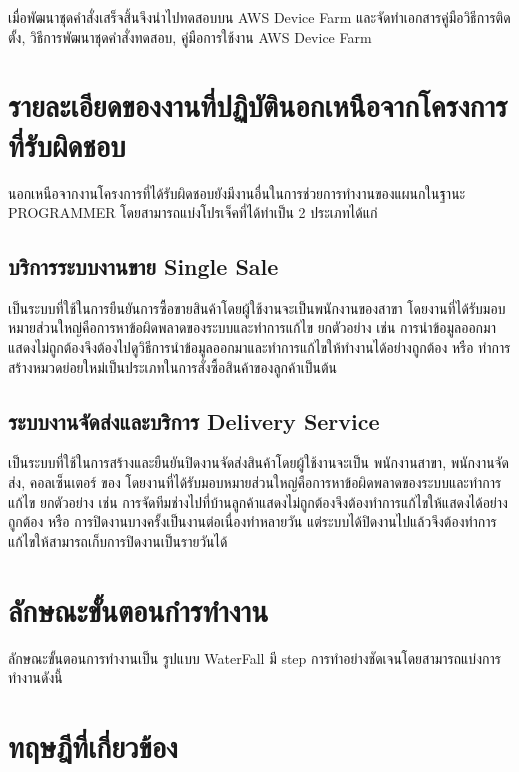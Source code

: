         เมื่อพัฒนาชุดคำสั่งเสร็จสิ้นจึงนำไปทดสอบบน AWS Device Farm และจัดทำเอกสารคู่มือวิธีการติดตั้ง, วิธีการพัฒนาชุดคำสั่งทดสอบ, คู่มือการใช้งาน AWS Device Farm

\newpage
\section{รายละเอียดของงานที่ปฏิบัตินอกเหนือจากโครงการที่รับผิดชอบ}
    นอกเหนือจากงานโครงการที่ได้รับผิดชอบยังมีงานอื่นในการช่วยการทำงานของแผนกในฐานะ PROGRAMMER โดยสามารถแบ่งโปรเจ็คที่ได้ทำเป็น 2 ประเภทได้แก่
    
    \subsection{บริการระบบงานขาย Single Sale}
        เป็นระบบที่ใช้ในการยืนยันการซื้อขายสินค้าโดยผู้ใช้งานจะเป็นพนักงานของสาขา {\Company} โดยงานที่ได้รับมอบหมายส่วนใหญ่คือการหาข้อผิดพลาดของระบบและทำการแก้ไข
        ยกตัวอย่าง เช่น การนำข้อมูลออกมาแสดงไม่ถูกต้องจึงต้องไปดูวิธีการนำข้อมูลออกมาและทำการแก้ไขให้ทำงานได้อย่างถูกต้อง หรือ ทำการสร้างหมวดย่อยใหม่เป็นประเภทในการสั่งซื้อสินค้าของลูกค้าเป็นต้น
    
    \subsection{ระบบงานจัดส่งและบริการ Delivery Service}
        เป็นระบบที่ใช้ในการสร้างและยืนยันปิดงานจัดส่งสินค้าโดยผู้ใช้งานจะเป็น พนักงานสาขา, พนักงานจัดส่ง, คอลเซ็นเตอร์ ของ {\Company} โดยงานที่ได้รับมอบหมายส่วนใหญ่คือการหาข้อผิดพลาดของระบบและทำการแก้ไข
        ยกตัวอย่าง เช่น การจัดทีมช่างไปที่บ้านลูกค้าแสดงไม่ถูกต้องจึงต้องทำการแก้ไขให้แสดงได้อย่างถูกต้อง หรือ การปิดงานบางครั้งเป็นงานต่อเนื่องทำหลายวัน
        แต่ระบบได้ปิดงานไปแล้วจึงต้องทำการแก้ไขให้สามารถเก็บการปิดงานเป็นรายวันได้

\section{ลักษณะขั้นตอนกํารทำงาน}
        ลักษณะขั้นตอนการทำงานเป็น รูปแบบ WaterFall มี step การทำอย่างชัดเจนโดยสามารถแบ่งการทำงานดังนี้

\section{ทฤษฎีที่เกี่ยวข้อง}
